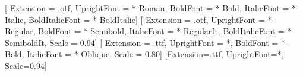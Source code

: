 
\usepackage{fontspec}
\setmainfont{XCharter}[
  Extension      = .otf,
  UprightFont    = *-Roman,
  BoldFont       = *-Bold,
  ItalicFont     = *-Italic,
  BoldItalicFont = *-BoldItalic]
\setsansfont{SourceSans3}[
  Extension      = .otf,
  UprightFont    = *-Regular,
  BoldFont       = *-Semibold,
  ItalicFont     = *-RegularIt,
  BoldItalicFont = *-SemiboldIt,
  Scale          = 0.94]
\setmonofont{DejaVuSansMono}[
  Extension   = .ttf,
  UprightFont = *,
  BoldFont    = *-Bold,
  ItalicFont  = *-Oblique,
  Scale       = 0.80]
\newfontfamily{}[Extension=.ttf, UprightFont=*, Scale=0.94]

\usepackage{etoolbox}
\usepackage{titling}
\usepackage{microtype}
\usepackage{fancyhdr}
\usepackage{titlesec}
\usepackage{enumitem}
\usepackage{ragged2e}
\usepackage{array}
\usepackage{amssymb}
\usepackage{newunicodechar}




